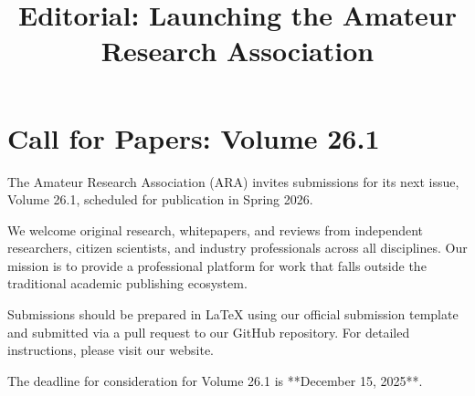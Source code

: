\documentclass[conference, compsoc, draft]{IEEEtran}
\title{Editorial: Launching the Amateur Research Association}
\author{
    \IEEEauthorblockN{The ARA Founding Committee}
    \IEEEauthorblockA{
        contact@ara.pub \\
        https://ara.pub
    }
}
\begin{document}
\section*{Call for Papers: Volume 26.1}

The Amateur Research Association (ARA) invites submissions for its next issue, Volume 26.1, scheduled for publication in Spring 2026.

We welcome original research, whitepapers, and reviews from independent researchers, citizen scientists, and industry professionals across all disciplines. Our mission is to provide a professional platform for work that falls outside the traditional academic publishing ecosystem.

Submissions should be prepared in LaTeX using our official submission template and submitted via a pull request to our GitHub repository. For detailed instructions, please visit our website.

The deadline for consideration for Volume 26.1 is **December 15, 2025**.
\end{document}
